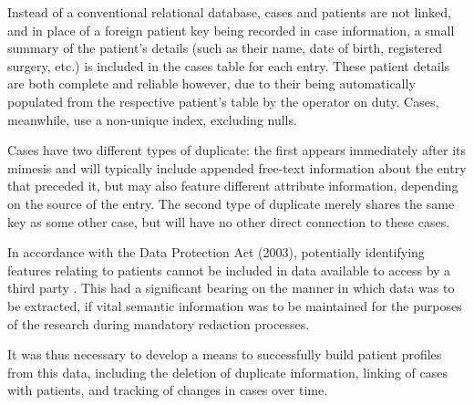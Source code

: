  
 
 Instead of a conventional relational database, cases and patients are not linked, and in place of a foreign patient key being recorded in case information, a small summary of the patient’s details (such as their name, date of birth, registered surgery, etc.) is included in the cases table for each entry. These patient details are both complete and reliable however, due to their being automatically populated from the respective patient’s table by the operator on duty. Cases, meanwhile, use a non-unique index, excluding nulls. 



Cases have two different types of duplicate: the first appears immediately after its mimesis and will typically include appended free-text information about the entry that preceded it, but may also feature different attribute information, depending on the source of the entry. The second type of duplicate merely shares the same key as some other case, but will have no other direct connection to these cases. 

In accordance with the Data Protection Act (2003), potentially identifying features relating to patients cannot be included in data available to access by a third party \cite{commissioner2004data}. This had a significant bearing on the manner in which data was to be extracted, if vital semantic information was to be maintained for the purposes of the research during mandatory redaction processes.

It was thus necessary to develop a means to successfully build patient profiles from this data, including the deletion of duplicate information, linking of cases with patients, and tracking of changes in cases over time. 


